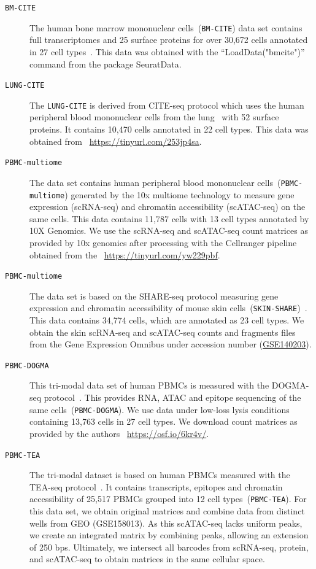 \begin{description}
	\item[{\texttt{BM-CITE}}]
	The human bone marrow mononuclear cells~({\texttt{BM-CITE}}) data set contains full transcriptomes and 25 surface proteins for over 30,672 cells annotated in 27 cell types~\citep{hao2021seurat4}. This data was obtained with the ``LoadData("bmcite")'' command from the package SeuratData. 

	\item[{\texttt{LUNG-CITE}}]
	The \texttt{LUNG-CITE} is derived from CITE-seq protocol which uses the human peripheral blood mononuclear cells from the lung~\citep{buus2021improving} with 52 surface proteins. It contains 10,470 cells annotated in 22 cell types. This data was obtained from ~\url{https://tinyurl.com/253jp4sa}.

	\item[{\texttt{PBMC-multiome}}]
  	The data set contains human peripheral blood mononuclear cells~({\texttt{PBMC-multiome}}) generated by the 10x multiome technology to measure gene expression (scRNA-seq) and chromatin accessibility (scATAC-seq) on the same cells. This data contains 11,787 cells with 13 cell types annotated by 10X Genomics.  We use the scRNA-seq and scATAC-seq count matrices as provided by 10x genomics after processing with the Cellranger pipeline obtained from the ~\url{https://tinyurl.com/yw229pbf}.

	\item[{\texttt{PBMC-multiome}}]
	The data set is based on the SHARE-seq protocol measuring gene expression and chromatin accessibility of mouse skin cells~({\texttt{SKIN-SHARE}})~\citep{ma2020shareseq}. This data contains 34,774 cells, which are annotated as 23 cell types. We obtain the skin scRNA-seq and scATAC-seq counts and fragments files from the Gene Expression Omnibus under accession number (\href{https://www.ncbi.nlm.nih.gov/geo/query/acc.cgi?acc=GSE140203}{GSE140203}).

	\item[{\texttt{PBMC-DOGMA}}]
	This tri-modal data set of human PBMCs is measured with the DOGMA-seq protocol~\citep{mimitou2021scalable}. This provides RNA, ATAC and epitope sequencing of the same cells~({\texttt{PBMC-DOGMA}}). We use data under low-loss lysis conditions containing 13,763 cells in 27 cell types. We download count matrices as provided by the authors ~\url{https://osf.io/6kr4v/}.

	\item[{\texttt{PBMC-TEA}}]
	The tri-modal dataset is based on human PBMCs measured with the TEA-seq protocol~\citep{swanson2021simultaneous}. It contains transcripts, epitopes and chromatin accessibility of 25,517 PBMCs grouped into 12 cell types~({\texttt{PBMC-TEA}}). For this data set, we obtain original matrices and combine data from distinct wells from GEO (GSE158013). As this scATAC-seq lacks uniform peaks, we create an integrated matrix by combining peaks, allowing an extension of 250 bps. Ultimately, we intersect all barcodes from scRNA-seq, protein, and scATAC-seq to obtain matrices in the same cellular space.
\end{description}

